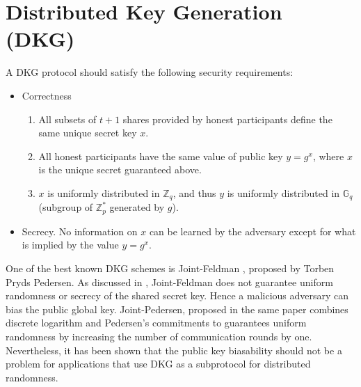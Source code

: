 \documentclass[letterpaper,twocolumn,10pt]{article}
\theoremstyle{definition}
\theoremstyle{remark}
\begin{document}
\section{Distributed Key Generation (DKG)}
\label{appendix:dkg}
A DKG protocol should satisfy the following security requirements:
\begin{itemize}
    \item Correctness
        \begin{enumerate}
        \item All subsets of $t+1$ shares provided by honest participants define the same unique secret key $x$.
        \item All honest participants have the same value of public key $y=g^x$, where $x$ is the unique secret guaranteed above.
        \item $x$ is uniformly distributed in $\mathbb{Z}_q$, and thus $y$ is uniformly distributed in $\mathbb{G}_q$ (subgroup of $\mathbb{Z}^*_p$ generated by $g$).
        \end{enumerate}
        
    \item Secrecy. No information on $x$ can be learned by the adversary except for what is implied by the value $y = g^x$.
\end{itemize}

One of the best known DKG schemes is Joint-Feldman \cite{pedersen1991threshold}, proposed by Torben Pryds Pedersen. As discussed in \cite{gennaro1999secure}, Joint-Feldman does not guarantee uniform randomness or secrecy of the shared secret key. Hence a malicious adversary can bias the public global key. Joint-Pedersen, proposed in the same paper combines discrete logarithm and Pedersen's commitments to guarantees uniform randomness by increasing the number of communication rounds by one.  Nevertheless, it has been shown that the public key biasability should not be a problem for applications that use DKG as a subprotocol for distributed randomness.
\end{document}
